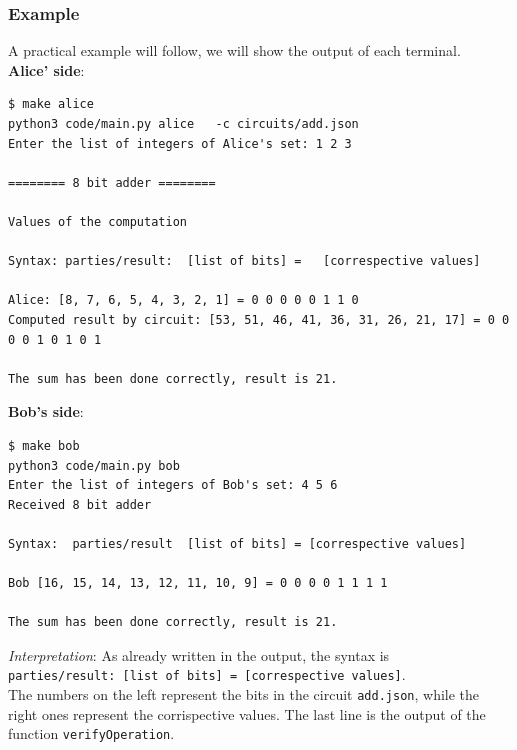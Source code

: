 \documentclass[12pt]{article}
\newcommand{\inlinecode}{\texttt}
\begin{document}
\subsubsection{Example}
A practical example will follow, we will show the output of each terminal.\\
\textbf{Alice' side}:
\begin{lstlisting}[frame=single, basicstyle=\scriptsize]
$ make alice
python3 code/main.py alice   -c circuits/add.json
Enter the list of integers of Alice's set: 1 2 3

======== 8 bit adder ========

Values of the computation

Syntax: parties/result:  [list of bits] =   [correspective values]

Alice: [8, 7, 6, 5, 4, 3, 2, 1] = 0 0 0 0 0 1 1 0
Computed result by circuit: [53, 51, 46, 41, 36, 31, 26, 21, 17] = 0 0 0 0 1 0 1 0 1

The sum has been done correctly, result is 21.
\end{lstlisting}
\vfill
\clearpage
\textbf{Bob's side}:
\begin{lstlisting}[frame=single, basicstyle=\scriptsize]
$ make bob
python3 code/main.py bob
Enter the list of integers of Bob's set: 4 5 6
Received 8 bit adder

Syntax:  parties/result  [list of bits] = [correspective values]

Bob [16, 15, 14, 13, 12, 11, 10, 9] = 0 0 0 0 1 1 1 1

The sum has been done correctly, result is 21.
\end{lstlisting}
\textit{Interpretation}: As already written in the output, the syntax is\\ \inlinecode{parties/result:  [list of bits] =   [correspective values]}.\\
The numbers on the left represent the bits in the circuit \inlinecode{add.json}, while the right ones represent the corrispective values. The last line is the output of the function \inlinecode{verifyOperation}.





\end{document}
